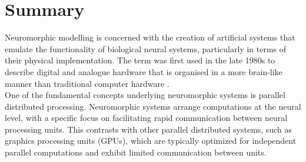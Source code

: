 
\section[Summary]{Summary}

\noindent Neuromorphic modelling is concerned with the creation of artificial systems that emulate the functionality of biological neural systems, particularly in terms of their physical implementation. The term was first used in the late 1980s to describe digital and analogue hardware that is organised in a more brain-like manner than traditional computer hardware \cite{mead1990neuromorphic}. \\

\noindent One of the fundamental concepts underlying neuromorphic systems is parallel distributed processing. Neuromorphic systems arrange computations at the neural level, with a specific focus on facilitating rapid communication between neural processing units. This contrasts with other parallel distributed systems, such as graphics processing units (GPUs), which are typically optimized for independent parallel computations and exhibit limited communication between units. \\

